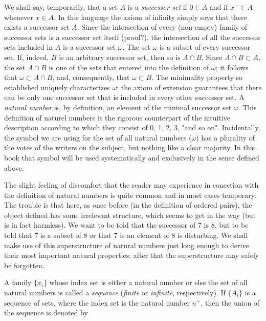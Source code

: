 We shall say, temporarily, that a set $A$ is a \textit{successor set} if $0 \in A$ and if $x^{+} \in A$ whenever $x \in A$. In this language the axiom of infinity simply says that there exists a successor set $A$. Since the intersection of every (non-empty) family of successor sets is a successor set itself (proof?), the intersection of all the successor sets included in $A$ is a successor set $ \omega $. The set $ \omega $ is a subset of every successor set. If, indeed, $B$ is an arbitrary successor set, then so is $A \cap B$. Since $ A \cap B \subset A$, the set $A \cap B$ is one of the sets that entered into the definition of $ \omega $; it follows that $ \omega \subset A \cap B$, and, consequently, that $\omega  \subset B$. The minimality property so established uniquely characterizes $ \omega $; the axiom of extension guarantees that there can be only one successor set that is included in every other successor set. A \textit{natural number} is, by definition, an element of the minimal successor set $ \omega$. This definition of naturel numbers is the rigorous counterpart of the intuitive description according to which they consist of 0, 1, 2, 3, "and so on". Incidentally, the symbol we are using for the set of all natural numbers ($ \omega $) has a plurality of the votes of the writers on the subject, but nothing like a clear majority. In this book that symbol will be used systematically and exclusively in the sense defined above.

The slight feeling of discomfort that the reader may experience in conection with the definition of natural numbers is quite common and in most cases temporary. The trouble is that here, as once before (in the definition of ordered pairs), the object defined has some irrelevant structure, which seems to get in the way (but is in fact harmless). We want to be told that the successor of $7$ is $8$, but to be told that $7$ is a subset of $8$ or that $7$ is an element of $8$ is disturbing. We shall make use of this superstructure of natural numbers just long enough to derive their most important natural properties; after that the superstructure may safely be forgotten.

A family $ \{ x_{i} \} $ whose index set is either a natural number or else the set of all natural numbers is called a \textit{sequence} (\textit{finite} or \textit{infinite}, respectively). If $\{ A_{i} \}$ is a sequence of sets, where the index set is the natural number $n^{+}$, then the union of the sequence is denoted by

